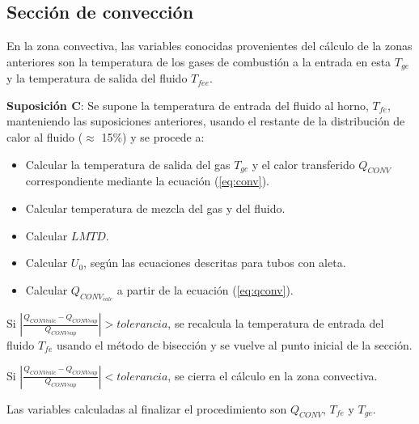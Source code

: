 \subsection{Sección de convección}
\par En la zona convectiva, las variables conocidas provenientes del cálculo de la zonas anteriores son la temperatura de los gases de combustión a la entrada en esta $T_{ge}$ y la temperatura de salida del fluido $T_{fee}$.
\par \textbf{Suposición C}: Se supone la temperatura de entrada del fluido al horno, $T_{fe}$, manteniendo las suposiciones anteriores, usando el restante de la distribución de calor al fluido ($\approx$ 15\%) y se procede a:
\begin{itemize}
\item Calcular la temperatura de salida del gas $T_{gc}$ y el calor transferido $Q_{CONV}$ correspondiente mediante la ecuación (\ref{eq:conv}).
\item Calcular temperatura de mezcla del gas y del fluido.
\item Calcular $LMTD$.
\item Calcular $U_0$, según las ecuaciones descritas para tubos con aleta.
\item Calcular $Q_{CONV_{calc}}$ a partir de la ecuación (\ref{eq:qconv}).
\end{itemize}
\par Si $|\frac{Q_{CONVcalc} - Q_{CONVsup}}{Q_{CONVsup}} | > tolerancia$, se recalcula la temperatura de entrada del fluido $T_{fe}$ usando el método de bisección y se vuelve al punto inicial de la sección.
\par Si $|\frac{Q_{CONVcalc} - Q_{CONVsup}}{Q_{CONVsup}} | < tolerancia$, se cierra el cálculo en la zona convectiva.
\par Las variables calculadas al finalizar el procedimiento son  $Q_{CONV}$, $T_{fe}$ y $T_{ge}$.

